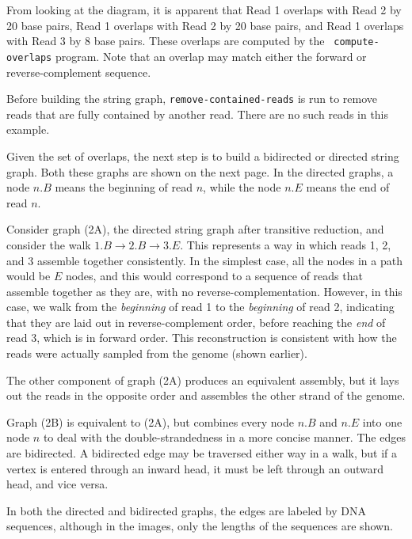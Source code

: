 \documentclass[letterpaper,12pt]{article}
\begin{document}
From looking at the diagram, it is apparent that Read 1 overlaps with Read 2 by
20 base pairs, Read 1 overlaps with Read 2 by 20 base pairs, and Read 1 overlaps
with Read 3 by 8 base pairs.  These overlaps are computed by the {\tt
compute-overlaps} program.  Note that an overlap may match either the forward or
reverse-complement sequence.

Before building the string graph, {\tt remove-contained-reads} is run to remove reads
that are fully contained by another read.  There are no such reads in this
example.

Given the set of overlaps, the next step is to build a bidirected or directed
string graph.  Both these graphs are shown on the next page.  In the directed
graphs, a node $n.B$ means the beginning of read $n$, while the node $n.E$ means
the end of read $n$.

Consider graph (2A), the directed string graph after transitive reduction, and
consider the walk $1.B \to 2.B \to 3.E$.  This represents a way in which reads
1, 2, and 3 assemble together consistently.  In the simplest case, all the nodes
in a path would be $E$ nodes, and this would correspond to a sequence of reads
that assemble together as they are, with no reverse-complementation.  However,
in this case, we walk from the {\it beginning} of read 1 to the {\it beginning}
of read 2, indicating that they are laid out in reverse-complement order, before
reaching the {\it end} of read 3, which is in forward order.  This
reconstruction is consistent with how the reads were actually sampled from the
genome (shown earlier).

The other component of graph (2A) produces an equivalent assembly, but it lays
out the reads in the opposite order and assembles the other strand of the
genome.

Graph (2B) is equivalent to (2A), but combines every node $n.B$ and $n.E$ into
one node $n$ to deal with the double-strandedness in a more concise manner.  The
edges are bidirected.  A bidirected edge may be traversed either way in a walk,
but if a vertex is entered through an inward head, it must be left through an
outward head, and vice versa.

In both the directed and bidirected graphs, the edges are labeled by DNA
sequences, although in the images, only the lengths of the sequences are shown.
\end{document}
